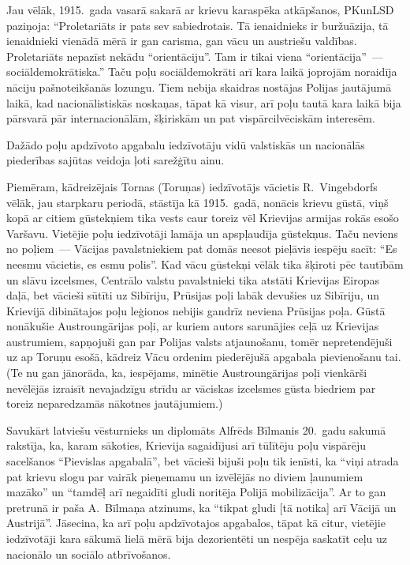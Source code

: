 \documentclass[twoside,a5paper,12pt,fleqn,openany]{extbook}
\begin{document}
Jau vēlāk, 1915.~gada vasarā sakarā ar krievu karaspēka atkāpšanos, PKunLSD paziņoja: ``Proletariāts ir pats sev sabiedrotais. Tā ienaidnieks ir buržuāzija, tā ienaidnieki vienādā mērā ir gan carisma, gan vācu un austriešu valdības. Proletariāts nepazīst nekādu ``orientāciju''. Tam ir tikai viena ``orientācija''~--- sociāldemokrātiska.'' Taču poļu sociāldemokrāti arī kara laikā joprojām noraidīja nāciju pašnoteikšanās lozungu. Tiem nebija skaidras nostājas Polijas jautājumā laikā, kad nacionālistiskās noskaņas, tāpat kā visur, arī poļu tautā kara laikā bija pārsvarā pār internacionālām, šķiriskām un pat vispārcilvēciskām interesēm.

Dažādo poļu apdzīvoto apgabalu iedzīvotāju vidū valstiskās un nacionālās piederības sajūtas veidoja ļoti sarežģītu ainu.

Piemēram, kādreizējais Tornas (Toruņas) iedzīvotājs vācietis R.~Vingebdorfs vēlāk, jau starpkaru periodā, stāstīja kā 1915.~gadā, nonācis krievu gūstā, viņš kopā ar citiem gūstekņiem tika vests caur toreiz vēl Krievijas armijas rokās esošo Varšavu. Vietējie poļu iedzīvotāji lamāja un apspļaudīja gūstekņus. Taču neviens no poļiem~--- Vācijas pavalstniekiem pat domās neesot pieļāvis iespēju sacīt: ``Es neesmu vācietis, es esmu polis''. Kad vācu gūstekņi vēlāk tika šķiroti pēc tautībām un slāvu izcelsmes, Centrālo valstu pavalstnieki tika atstāti Krievijas Eiropas daļā, bet vācieši sūtīti uz Sibīriju, Prūsijas poļi labāk devušies uz Sibīriju, un Krievijā dibinātajos poļu leģionos nebijis gandrīz neviena Prūsijas poļa. Gūstā nonākušie Austroungārijas poļi, ar kuriem autors sarunājies ceļā uz Krievijas austrumiem, sapņojuši gan par Polijas valsts atjaunošanu, tomēr nepretendējuši uz ap Toruņu esošā, kādreiz Vācu ordenim piederējušā apgabala pievienošanu tai. (Te nu gan jānorāda, ka, iespējams, minētie Austroungārijas poļi vienkārši nevēlējās izraisīt nevajadzīgu strīdu ar vāciskas izcelsmes gūsta biedriem par toreiz neparedzamās nākotnes jautājumiem.)

Savukārt latviešu vēsturnieks un diplomāts Alfrēds Bīlmanis 20.~gadu sakumā rakstīja, ka, karam sākoties, Krievija sagaidījusi arī tūlītēju poļu vispārēju sacelšanos ``Pievislas apgabalā'', bet vācieši bijuši poļu tik ienīsti, ka ``viņi atrada pat krievu slogu par vairāk pieņemamu un izvēlējās no diviem ļaunumiem mazāko'' un ``tamdēļ arī negaidīti gludi noritēja Polijā mobilizācija''. Ar to gan pretrunā ir paša A.~Bīlmaņa atzinums, ka ``tikpat gludi [tā notika] arī Vācijā un Austrijā''. Jāsecina, ka arī poļu apdzīvotajos apgabalos, tāpat kā citur, vietējie iedzīvotāji kara sākumā lielā mērā bija dezorientēti un nespēja saskatīt ceļu uz nacionālo un sociālo atbrīvošanos.
\end{document}
